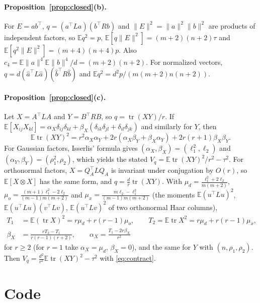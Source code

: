 \documentclass[11pt]{article}
\theoremstyle{remark}
\newcommand{\E}{\mathbb{E}}
\DeclareMathOperator{\tr}{tr}
\begin{document}
\paragraph{Proposition~\ref{prop:closed}(b).} For $E=ab^\top$, $q=(a^\top La)(b^\top Rb)$ and $\|E\|^2=\|a\|^2\|b\|^2$ are products of independent factors, so $\E q^2=p$, $\E[q\|E\|^2]=(m+2)(n+2)\tau$ and $\E[q^2\|E\|^2]=(m+4)(n+4)p$. Also $c_4=\E\|a\|^4\E\|b\|^4/d=(m+2)(n+2)$. For normalized vectors, $q=d(\hat a^\top L\hat a)(\hat b^\top R\hat b)$ and $\E q^2=d^2p/(m(m+2)n(n+2))$.

\paragraph{Proposition~\ref{prop:closed}(c).} Let $X=A^\top LA$ and $Y=B^\top RB$, so $q=\tr(XY)/r$. If $\E[X_{ij}X_{kl}]=\alpha_X\delta_{ij}\delta_{kl}+\beta_X(\delta_{ik}\delta_{jl}+\delta_{il}\delta_{jk})$ and similarly for $Y$, then
\begin{equation}\label{eq:contract}
\E\tr(XY)^2=r^2\alpha_X\alpha_Y+2r(\alpha_X\beta_Y+\beta_X\alpha_Y)+2r(r+1)\beta_X\beta_Y .
\end{equation}
For Gaussian factors, Isserlis' formula gives $(\alpha_X,\beta_X)=(\ell_1^2,\ell_2)$ and $(\alpha_Y,\beta_Y)=(\rho_1^2,\rho_2)$, which yields the stated $V_q=\E\tr(XY)^2/r^2-\tau^2$. For orthonormal factors, $X=Q_A^\top LQ_A$ is invariant under conjugation by $O(r)$, so $\E[X\otimes X]$ has the same form, and $q=\frac dr\tr(XY)$. With $\mu_d=\frac{\ell_1^2+2\ell_2}{m(m+2)}$, $\mu_o=\frac{(m+1)\ell_1^2-2\ell_2}{(m-1)m(m+2)}$ and $\mu_x=\frac{m\ell_2-\ell_1^2}{(m-1)m(m+2)}$ (the moments $\E(u^\top Lu)^2$, $\E(u^\top Lu)(v^\top Lv)$, $\E(u^\top Lv)^2$ of two orthonormal Haar columns),
\begin{align*}
T_1&=\E(\tr X)^2=r\mu_d+r(r-1)\mu_o,\qquad T_2=\E\tr X^2=r\mu_d+r(r-1)\mu_x,\\
\beta_X&=\frac{rT_2-T_1}{r(r-1)(r+2)},\qquad \alpha_X=\frac{T_1-2r\beta_X}{r^2}
\end{align*}
for $r\ge2$ (for $r=1$ take $\alpha_X=\mu_d$, $\beta_X=0$), and the same for $Y$ with $(n,\rho_1,\rho_2)$. Then $V_q=\frac{d^2}{r^2}\E\tr(XY)^2-\tau^2$ with \eqref{eq:contract}.

\section{Code}\label{app:code}


\end{document}
